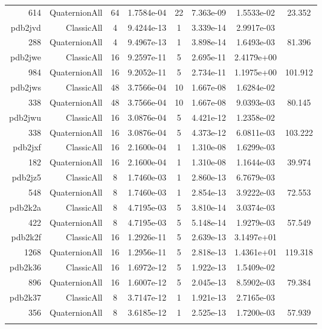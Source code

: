 \begin{xltabular}{\textwidth}{r|rcS[table-format=1.4e+2]cS[table-format=1.3e+2]S[table-format=1.4e+2]S[table-format=-1.3]}
614 & QuaternionAll & 64 & 1.7584e-04 & 22 & 7.363e-09 & 1.5533e-02 & 23.352\\  \addlinespace
pdb2jvd & ClassicAll & 4 & 9.4244e-13 & 1 & 3.339e-14 & 2.9917e-03 & \\
288 & QuaternionAll & 4 & 9.4967e-13 & 1 & 3.898e-14 & 1.6493e-03 & 81.396\\  \addlinespace
pdb2jwe & ClassicAll & 16 & 9.2597e-11 & 5 & 2.695e-11 & 2.4179e+00 & \\
984 & QuaternionAll & 16 & 9.2052e-11 & 5 & 2.734e-11 & 1.1975e+00 & 101.912\\  \addlinespace
pdb2jws & ClassicAll & 48 & 3.7566e-04 & 10 & 1.667e-08 & 1.6284e-02 & \\
338 & QuaternionAll & 48 & 3.7566e-04 & 10 & 1.667e-08 & 9.0393e-03 & 80.145\\  \addlinespace
pdb2jwu & ClassicAll & 16 & 3.0876e-04 & 5 & 4.421e-12 & 1.2358e-02 & \\
338 & QuaternionAll & 16 & 3.0876e-04 & 5 & 4.373e-12 & 6.0811e-03 & 103.222\\  \addlinespace
pdb2jxf & ClassicAll & 16 & 2.1600e-04 & 1 & 1.310e-08 & 1.6299e-03 & \\
182 & QuaternionAll & 16 & 2.1600e-04 & 1 & 1.310e-08 & 1.1644e-03 & 39.974\\  \addlinespace
pdb2jz5 & ClassicAll & 8 & 1.7460e-03 & 1 & 2.860e-13 & 6.7679e-03 & \\
548 & QuaternionAll & 8 & 1.7460e-03 & 1 & 2.854e-13 & 3.9222e-03 & 72.553\\  \addlinespace
pdb2k2a & ClassicAll & 8 & 4.7195e-03 & 5 & 3.810e-14 & 3.0374e-03 & \\
422 & QuaternionAll & 8 & 4.7195e-03 & 5 & 5.148e-14 & 1.9279e-03 & 57.549\\  \addlinespace
pdb2k2f & ClassicAll & 16 & 1.2926e-11 & 5 & 2.639e-13 & 3.1497e+01 & \\
1268 & QuaternionAll & 16 & 1.2956e-11 & 5 & 2.818e-13 & 1.4361e+01 & 119.318\\  \addlinespace
pdb2k36 & ClassicAll & 16 & 1.6972e-12 & 5 & 1.922e-13 & 1.5409e-02 & \\
896 & QuaternionAll & 16 & 1.6007e-12 & 5 & 2.045e-13 & 8.5902e-03 & 79.384\\  \addlinespace
pdb2k37 & ClassicAll & 8 & 3.7147e-12 & 1 & 1.921e-13 & 2.7165e-03 & \\
356 & QuaternionAll & 8 & 3.6185e-12 & 1 & 2.525e-13 & 1.7200e-03 & 57.939\\  \addlinespace

\end{xltabular}
